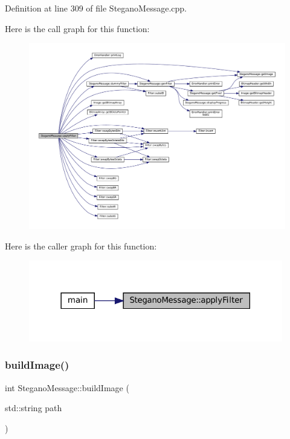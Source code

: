 Definition at line 309 of file Stegano\+Message.\+cpp.

Here is the call graph for this function\+:
\nopagebreak
\begin{figure}[H]
\begin{center}
\leavevmode
\includegraphics[width=350pt]{classSteganoMessage_aec575d6949cf2eb49adefe2f1299d075_cgraph}
\end{center}
\end{figure}
Here is the caller graph for this function\+:
\nopagebreak
\begin{figure}[H]
\begin{center}
\leavevmode
\includegraphics[width=314pt]{classSteganoMessage_aec575d6949cf2eb49adefe2f1299d075_icgraph}
\end{center}
\end{figure}
\mbox{\label{classSteganoMessage_ad90a4cf8cf03febfb4c3df955ccab13d}} 
\subsubsection{\texorpdfstring{buildImage()}{buildImage()}}
{\footnotesize\ttfamily int Stegano\+Message\+::build\+Image (\begin{DoxyParamCaption}\item[{std\+::string}]{path }\end{DoxyParamCaption})}



